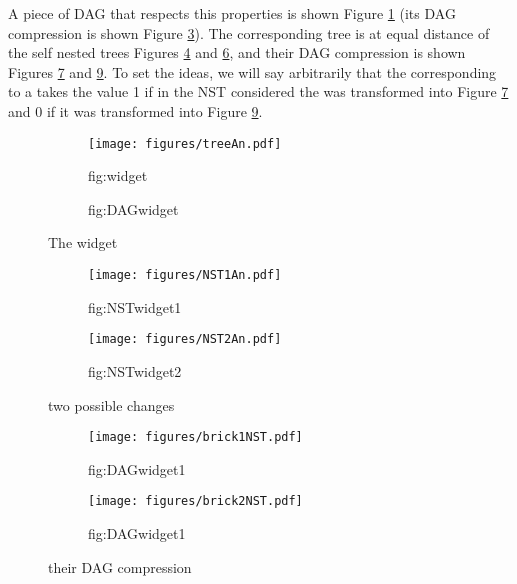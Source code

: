 A piece of DAG that respects this properties is shown Figure
\ref{fig:widget} (its DAG compression is shown Figure
\ref{fig:DAGwidget}). The corresponding tree is at equal distance of
the self nested trees Figures \ref{fig:NSTwidget1} and
\ref{fig:NSTwidget2}, and their DAG compression is shown Figures
\ref{fig:DAGwidget1} and \ref{fig:DAGwidget2}. To set the ideas, we
will say arbitrarily that the \variable corresponding to a \widget
takes the value 1 if in the NST considered the \widget was
transformed into Figure \ref{fig:DAGwidget1} and 0 if it was
transformed into Figure \ref{fig:DAGwidget2}.

\begin{figure}
 \begin{subfigure}[b]{0.45\textwidth}
    \centering
    \texttt{[image: figures/treeAn.pdf]}
    \caption{fig:widget}
    \label{fig:widget}
  \end{subfigure}
  \quad
  \begin{subfigure}[b]{0.45\textwidth}
    \centering
    \caption{fig:DAGwidget}
    \label{fig:DAGwidget}
  \end{subfigure} 
  \caption{The widget}%
\end{figure}

\begin{figure}
 \begin{subfigure}[b]{0.45\textwidth}
    \centering
    \texttt{[image: figures/NST1An.pdf]}
    \caption{fig:NSTwidget1}
    \label{fig:NSTwidget1}
  \end{subfigure}
  \quad
  \begin{subfigure}[b]{0.45\textwidth}
    \centering
    \texttt{[image: figures/NST2An.pdf]}
    \caption{fig:NSTwidget2}
    \label{fig:NSTwidget2}
  \end{subfigure} 
  \caption{two possible changes}%
\end{figure}

\begin{figure}
 \begin{subfigure}[b]{0.45\textwidth}
    \centering
    \texttt{[image: figures/brick1NST.pdf]}
    \caption{fig:DAGwidget1}
    \label{fig:DAGwidget1}
  \end{subfigure}
  \quad
  \begin{subfigure}[b]{0.45\textwidth}
    \centering
    \texttt{[image: figures/brick2NST.pdf]}
    \caption{fig:DAGwidget1}
    \label{fig:DAGwidget2}
  \end{subfigure} 
  \caption{their DAG compression}%
\end{figure}


